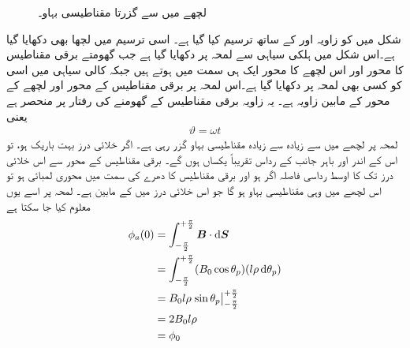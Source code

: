 \begin{figure}
\caption{لچھے میں سے گزرتا مقناطیسی بہاو۔}
\label{شکل_گھومتے_مشین_لچھے_سے_گزرتی_بیاو}
\end{figure}
%
شکل   میں  کو زاویہ  اور   کے ساتھ ترسیم کیا گیا ہے۔ اسی ترسیم میں لچھا  بھی دکھایا گیا ہے۔اس شکل میں ہلکی سیاہی سے لمحہ  پر  دکھایا گیا ہے جب گھومتے برقی مقناطیس کا محور اور اس لچھے کا محور ایک ہی سمت میں ہوتے ہیں جبکہ کالی سیاہی میں اسی  کو کسی  بھی لمحہ  پر دکھایا گیا ہے۔اس لمحہ پر برقی مقناطیس کے محور اور لچھے کے محور کے مابین  زاویہ ہے۔ یہ زاویہ برقی مقناطیس کے گھومنے کی رفتار  پر منحصر ہے یعنی
\begin{align}
\vartheta=\omega t
\end{align}
لمحہ  پر لچھے میں سے زیادہ سے زیادہ مقناطیسی بہاو گزر رہی ہے۔ اگر خلائی درز بہت باریک ہو، تو اس کے اندر اور باہر جانب کے رداس تقریباً یکساں ہوں گے۔ برقی مقناطیس کے محور سے اس خلائی درز تک کا اوسط رداسی فاصلہ اگر  ہو اور برقی مقناطیس کا دھرے کی سمت میں محوری لمبائی  ہو تو اس لچھے میں وہی مقناطیسی بہاو ہو گا جو اس خلائی درز میں    کے مابین ہے۔ لمحہ  پر اسے یوں معلوم کیا جا سکتا ہے
\begin{gather}
\begin{aligned}\label{مساوات_گھومتے_مشین_قطب_پر_بہاو}
\phi_a(0)&=\int_{-\frac{\pi}{2}}^{+\frac{\pi}{2}} \kvec{B} \cdot \dif \kvec{S}\\
&=\int_{-\frac{\pi}{2}}^{+\frac{\pi}{2}} (B_0 \cos \theta_p)(l \rho \dif \theta_p)\\
&=B_0 l \rho \left. \sin \theta_p \right|_{-\frac{\pi}{2}}^{+\frac{\pi}{2}}\\
&=2 B_0 l \rho\\
&=\phi_0
\end{aligned}
\end{gather}

